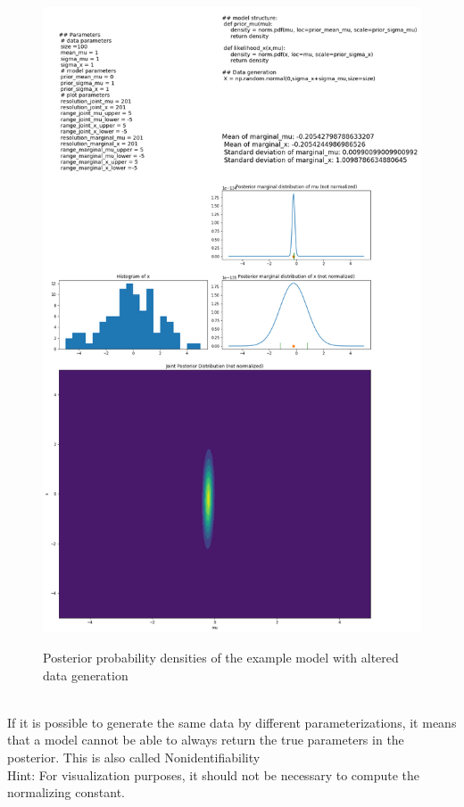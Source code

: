 \documentclass{article}
\begin{document}
\begin{figure}
	\includegraphics[width=\textwidth]{images/ground_truth_posterior_6.png}
	\label{fig:ground_truth_posterior_6}
	\caption[Posterior probability densities of the example model with altered data generation]{Posterior probability densities of the example model with altered data generation}
\end{figure}
\\
If it is possible to generate the same data by different parameterizations, it means that a model cannot be able to always return the true parameters in the posterior. This is also called Nonidentifiability
\\
Hint: For visualization purposes, it should not be necessary to compute the normalizing constant.
\end{document}
